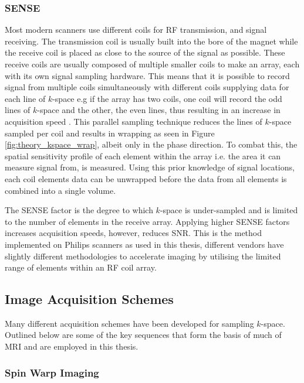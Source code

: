 \subsubsection{\ac*{SENSE}}
Most modern scanners use different coils for \ac{RF} transmission, and signal receiving. The transmission coil is usually built into the bore of the magnet while the receive coil is placed as close to the source of the signal as possible. These receive coils are usually composed of multiple smaller coils to make an array, each with its own signal sampling hardware. This means that it is possible to record signal from multiple coils simultaneously with different coils supplying data for each line of $k$-space e.g if the array has two coils, one coil will record the odd lines of $k$-space and the other, the even lines, thus resulting in an increase in acquisition speed \cite{pruessmann_sense_1999}. This parallel sampling technique reduces the lines of $k$-space sampled per coil and results in wrapping as seen in Figure \ref{fig:theory_kspace_wrap}, albeit only in the phase direction. To combat this, the spatial sensitivity profile of each element within the array i.e. the area it can measure signal from, is measured. Using this prior knowledge of signal locations, each coil elements data can be unwrapped before the data from all elements is combined into a single volume.

The \ac{SENSE} factor is the degree to which $k$-space is under-sampled and is limited to the number of elements in the receive array. Applying higher \ac{SENSE} factors increases acquisition speeds, however, reduces \ac{SNR}. This is the method implemented on Philips scanners as used in this thesis, different vendors have slightly different methodologies to accelerate imaging by utilising the limited range of elements within an \ac{RF} coil array.

\subsection{Image Acquisition Schemes}

Many different acquisition schemes have been developed for sampling $k$-space. Outlined below are some of the key sequences that form the basis of much of \ac{MRI} and are employed in this thesis.

\subsubsection{Spin Warp Imaging}

